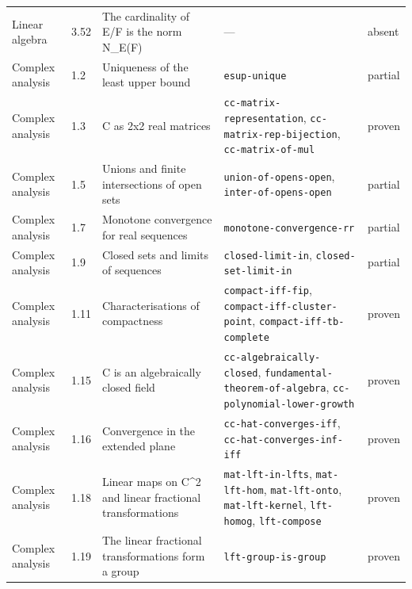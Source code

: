 \begin{longtable}{@{}ll>{\raggedright\arraybackslash}p{4.2cm}>{\raggedright\arraybackslash}p{4.2cm}l@{}}
Linear algebra & 3.52 & The cardinality of E/F is the norm N\_E(F) & --- & absent \\
Complex analysis & 1.2 & Uniqueness of the least upper bound & \texttt{esup-\allowbreak{}unique} & partial \\
Complex analysis & 1.3 & C as 2x2 real matrices & \texttt{cc-\allowbreak{}matrix-\allowbreak{}representation}, \texttt{cc-\allowbreak{}matrix-\allowbreak{}rep-\allowbreak{}bijection}, \texttt{cc-\allowbreak{}matrix-\allowbreak{}of-\allowbreak{}mul} & proven \\
Complex analysis & 1.5 & Unions and finite intersections of open sets & \texttt{union-\allowbreak{}of-\allowbreak{}opens-\allowbreak{}open}, \texttt{inter-\allowbreak{}of-\allowbreak{}opens-\allowbreak{}open} & partial \\
Complex analysis & 1.7 & Monotone convergence for real sequences & \texttt{monotone-\allowbreak{}convergence-\allowbreak{}rr} & partial \\
Complex analysis & 1.9 & Closed sets and limits of sequences & \texttt{closed-\allowbreak{}limit-\allowbreak{}in}, \texttt{closed-\allowbreak{}set-\allowbreak{}limit-\allowbreak{}in} & partial \\
Complex analysis & 1.11 & Characterisations of compactness & \texttt{compact-\allowbreak{}iff-\allowbreak{}fip}, \texttt{compact-\allowbreak{}iff-\allowbreak{}cluster-\allowbreak{}point}, \texttt{compact-\allowbreak{}iff-\allowbreak{}tb-\allowbreak{}complete} & proven \\
Complex analysis & 1.15 & C is an algebraically closed field & \texttt{cc-\allowbreak{}algebraically-\allowbreak{}closed}, \texttt{fundamental-\allowbreak{}theorem-\allowbreak{}of-\allowbreak{}algebra}, \texttt{cc-\allowbreak{}polynomial-\allowbreak{}lower-\allowbreak{}growth} & proven \\
Complex analysis & 1.16 & Convergence in the extended plane & \texttt{cc-\allowbreak{}hat-\allowbreak{}converges-\allowbreak{}iff}, \texttt{cc-\allowbreak{}hat-\allowbreak{}converges-\allowbreak{}inf-\allowbreak{}iff} & proven \\
Complex analysis & 1.18 & Linear maps on C\textasciicircum{}2 and linear fractional transformations & \texttt{mat-\allowbreak{}lft-\allowbreak{}in-\allowbreak{}lfts}, \texttt{mat-\allowbreak{}lft-\allowbreak{}hom}, \texttt{mat-\allowbreak{}lft-\allowbreak{}onto}, \texttt{mat-\allowbreak{}lft-\allowbreak{}kernel}, \texttt{lft-\allowbreak{}homog}, \texttt{lft-\allowbreak{}compose} & proven \\
Complex analysis & 1.19 & The linear fractional transformations form a group & \texttt{lft-\allowbreak{}group-\allowbreak{}is-\allowbreak{}group} & proven \\

\end{longtable}
